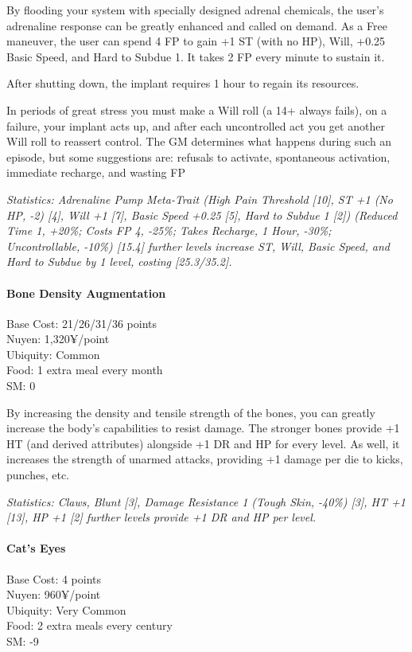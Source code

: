 \begin{multicols*}{3}
	By flooding your system with specially designed adrenal chemicals, the user's adrenaline response can be greatly enhanced and called on demand. As a Free maneuver, the user can spend 4 FP to gain +1 ST (with no HP), Will, +0.25 Basic Speed, and Hard to Subdue 1. It takes 2 FP every minute to sustain it. 
	
	After shutting down, the implant requires 1 hour to regain its resources. 
	
	In periods of great stress you must make a Will roll (a 14+ always fails), on a failure, your implant acts up, and after each uncontrolled act you get another Will roll to reassert control. The GM determines what happens during such an episode, but some suggestions are: refusals to activate, spontaneous activation, immediate recharge, and wasting FP
	
	\textit{\textcolor{OliveGreen}{Statistics: Adrenaline Pump Meta-Trait (High Pain Threshold [10], ST +1 (No HP, -2) [4], Will +1 [7], Basic Speed +0.25 [5], Hard to Subdue 1 [2]) (Reduced Time 1, +20\%; Costs FP 4, -25\%; Takes Recharge, 1 Hour, -30\%; Uncontrollable, -10\%) [15.4] further levels increase ST, Will, Basic Speed, and Hard to Subdue by 1 level, costing [25.3/35.2].}}
	
	\paragraph{Bone Density Augmentation}
	\begin{flushright}
		Base Cost: 21/26/31/36 points\\
		Nuyen: 1,320¥/point\\
		Ubiquity: Common\\
		Food: 1 extra meal every month\\
		SM: 0\\
	\end{flushright}
	
	By increasing the density and tensile strength of the bones, you can greatly increase the body's capabilities to resist damage. The stronger bones provide +1 HT (and derived attributes) alongside +1 DR and HP for every level. As well, it increases the strength of unarmed attacks, providing +1 damage per die to kicks, punches, etc.
	
	\textit{\textcolor{OliveGreen}{Statistics: Claws, Blunt [3], Damage Resistance 1 (Tough Skin, -40\%) [3], HT +1 [13], HP +1 [2] further levels provide +1 DR and HP per level.}}
	
	\paragraph{Cat's Eyes}
	\begin{flushright}
		Base Cost: 4 points\\
		Nuyen: 960¥/point\\
		Ubiquity: Very Common\\
		Food: 2 extra meals every century\\
		SM: -9\\
	\end{flushright}
	

\end{multicols*}
